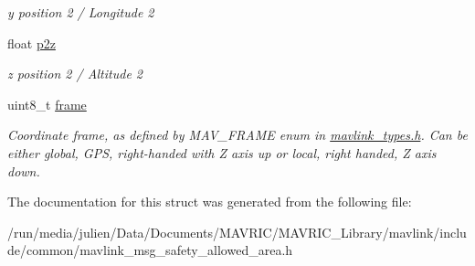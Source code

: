 \begin{DoxyCompactItemize}
\begin{DoxyCompactList}\small\item\em y position 2 / Longitude 2 \end{DoxyCompactList}\item 
\hypertarget{struct____mavlink__safety__allowed__area__t_a9af8420ae1c69890ec5dfafd54785d91}{float \hyperlink{struct____mavlink__safety__allowed__area__t_a9af8420ae1c69890ec5dfafd54785d91}{p2z}}\label{struct____mavlink__safety__allowed__area__t_a9af8420ae1c69890ec5dfafd54785d91}

\begin{DoxyCompactList}\small\item\em z position 2 / Altitude 2 \end{DoxyCompactList}\item 
\hypertarget{struct____mavlink__safety__allowed__area__t_a8b809d2612e4c0ccb4a7d89841fa509c}{uint8\+\_\+t \hyperlink{struct____mavlink__safety__allowed__area__t_a8b809d2612e4c0ccb4a7d89841fa509c}{frame}}\label{struct____mavlink__safety__allowed__area__t_a8b809d2612e4c0ccb4a7d89841fa509c}

\begin{DoxyCompactList}\small\item\em Coordinate frame, as defined by M\+A\+V\+\_\+\+F\+R\+A\+M\+E enum in \hyperlink{mavlink__types_8h_source}{mavlink\+\_\+types.\+h}. Can be either global, G\+P\+S, right-\/handed with Z axis up or local, right handed, Z axis down. \end{DoxyCompactList}\end{DoxyCompactItemize}


The documentation for this struct was generated from the following file\+:\begin{DoxyCompactItemize}
\item 
/run/media/julien/\+Data/\+Documents/\+M\+A\+V\+R\+I\+C/\+M\+A\+V\+R\+I\+C\+\_\+\+Library/mavlink/include/common/mavlink\+\_\+msg\+\_\+safety\+\_\+allowed\+\_\+area.\+h\end{DoxyCompactItemize}
